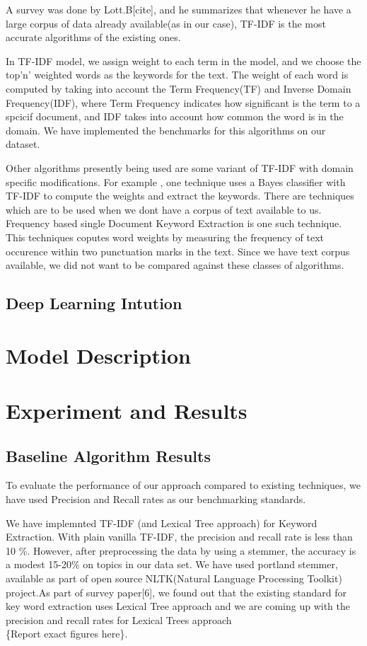 \documentclass[dvips,12pt]{article}
\begin{document}
		A survey was done by Lott.B[cite], and he summarizes that whenever he have a large corpus of data already available(as in our case), TF-IDF is the most accurate algorithms of the existing ones. 
		
		In TF-IDF model, we assign weight to each term in the model, and we choose the top'n' weighted words as the keywords for the text. The weight of each word is computed by taking into account the Term Frequency(TF) and Inverse Domain Frequency(IDF), where Term Frequency indicates how significant is the term to a spcicif document, and IDF takes into account how common the word is in the domain. We have implemented the benchmarks for this algorithms on our dataset.
		
		Other algorithms presently being used are some variant of TF-IDF with domain specific modifications. For example , one technique uses a Bayes classifier with TF-IDF to compute the weights and extract the keywords. 
		There are techniques which are to be used when we dont have a corpus of text available to us. Frequency based single Document Keyword Extraction is one such technique. This techniques coputes word weights by measuring the frequency of text occurence within two punctuation marks in the text. Since we have text corpus available, we did not want to be compared against these classes of algorithms.
		\subsection{Deep Learning Intution}
	\section{Model Description}
	
	\section{Experiment and Results}
		\subsection{Baseline Algorithm Results}
		
		To evaluate the performance of our approach compared to existing techniques, we have used Precision and Recall rates as our benchmarking standards.
		
		We have implemnted TF-IDF (and Lexical Tree approach) for Keyword Extraction. With plain vanilla TF-IDF, the precision and recall rate is less than 10 \%. However, after preprocessing the data by using a stemmer, the accuracy is a modest 15-20\% on topics in our data set.
		We have used portland stemmer, available as part of open source NLTK(Natural Language Processing Toolkit) project.As part of survey paper[6], we found out that the existing standard for key word extraction uses Lexical Tree approach and we are coming up with the precision and recall rates for Lexical Trees approach \\\{Report exact figures here\}.
		
\end{document}
